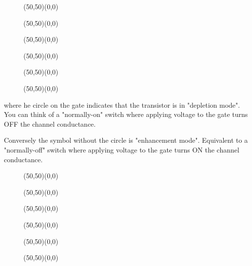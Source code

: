 	\begin{figure}[H]
		\vspace{2cm}
		\begin{center}
		\begin{picture}(50,50)(0,0)
		\end{picture}
		\begin{picture}(50,50)(0,0)
		\end{picture}
		\begin{picture}(50,50)(0,0)
		\end{picture}
		\begin{picture}(50,50)(0,0)
		\end{picture}
		\begin{picture}(50,50)(0,0)
		\end{picture}
		\begin{picture}(50,50)(0,0) %
		\end{picture}
		\end{center}
	\end{figure}
	where he circle on the gate indicates that the transistor is in "depletion mode".  You can think of a "normally-on" switch where applying voltage to the gate turns OFF the channel conductance.  
	
	Conversely the symbol without the circle is "enhancement mode".
Equivalent to a "normally-off" switch where applying voltage to the gate turns ON the channel conductance.
	\begin{figure}[H]
		\vspace{1cm}
		\begin{center}
		\begin{picture}(50,50)(0,0)
		\end{picture}
		\begin{picture}(50,50)(0,0)
		\end{picture}
		\begin{picture}(50,50)(0,0)
		\end{picture}
		\begin{picture}(50,50)(0,0)
		\end{picture}
		\begin{picture}(50,50)(0,0)
		\end{picture}
		\begin{picture}(50,50)(0,0)
		\end{picture}\\[2cm]
		\end{center}
	\end{figure}

